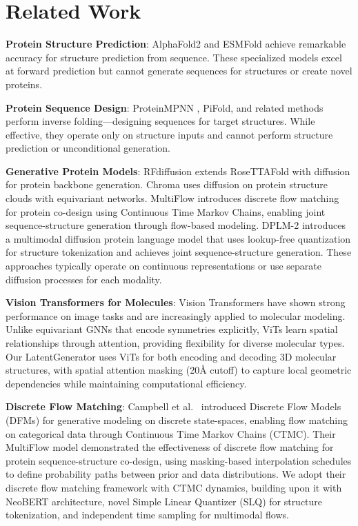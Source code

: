 \documentclass[11pt,a4paper]{article}
\begin{document}
\section{Related Work}

\textbf{Protein Structure Prediction}: AlphaFold2 and ESMFold \cite{lin2023} achieve remarkable accuracy for structure prediction from sequence. These specialized models excel at forward prediction but cannot generate sequences for structures or create novel proteins.

\textbf{Protein Sequence Design}: ProteinMPNN \cite{dauparas2022}, PiFold, and related methods perform inverse folding---designing sequences for target structures. While effective, they operate only on structure inputs and cannot perform structure prediction or unconditional generation.

\textbf{Generative Protein Models}: RFdiffusion extends RoseTTAFold with diffusion for protein backbone generation. Chroma uses diffusion on protein structure clouds with equivariant networks. MultiFlow \cite{campbell2024} introduces discrete flow matching for protein co-design using Continuous Time Markov Chains, enabling joint sequence-structure generation through flow-based modeling. DPLM-2 \cite{wang2024} introduces a multimodal diffusion protein language model that uses lookup-free quantization for structure tokenization and achieves joint sequence-structure generation. These approaches typically operate on continuous representations or use separate diffusion processes for each modality.

\textbf{Vision Transformers for Molecules}: Vision Transformers have shown strong performance on image tasks and are increasingly applied to molecular modeling. Unlike equivariant GNNs that encode symmetries explicitly, ViTs learn spatial relationships through attention, providing flexibility for diverse molecular types. Our LatentGenerator uses ViTs for both encoding and decoding 3D molecular structures, with spatial attention masking (20Å cutoff) to capture local geometric dependencies while maintaining computational efficiency.

\textbf{Discrete Flow Matching}: Campbell et al.~\cite{campbell2024} introduced Discrete Flow Models (DFMs) for generative modeling on discrete state-spaces, enabling flow matching on categorical data through Continuous Time Markov Chains (CTMC). Their MultiFlow model demonstrated the effectiveness of discrete flow matching for protein sequence-structure co-design, using masking-based interpolation schedules to define probability paths between prior and data distributions. We adopt their discrete flow matching framework with CTMC dynamics, building upon it with NeoBERT architecture, novel Simple Linear Quantizer (SLQ) for structure tokenization, and independent time sampling for multimodal flows.
\end{document}
